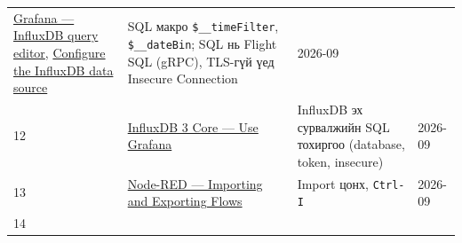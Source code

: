 \begin{longtable}[]{@{}llll@{}}
\begin{minipage}[t]{0.22\columnwidth}
\href{https://grafana.com/docs/grafana/latest/datasources/influxdb/query-editor/}{Grafana --- InfluxDB query editor}, \href{https://grafana.com/docs/grafana/latest/datasources/influxdb/configure/}{Configure the InfluxDB data source}\strut
\end{minipage} & \begin{minipage}[t]{0.22\columnwidth}\raggedright
SQL макро \texttt{\$\_\allowbreak{}\_\allowbreak{}timeFilter}, \texttt{\$\_\allowbreak{}\_\allowbreak{}dateBin}; SQL нь Flight SQL (gRPC), TLS-гүй үед Insecure Connection\strut
\end{minipage} & \begin{minipage}[t]{0.22\columnwidth}\raggedright
2026-09\strut
\end{minipage}\tabularnewline
\begin{minipage}[t]{0.22\columnwidth}\raggedright
12\strut
\end{minipage} & \begin{minipage}[t]{0.22\columnwidth}\raggedright
\href{https://docs.influxdata.com/influxdb3/core/visualize-data/grafana/}{InfluxDB 3 Core --- Use Grafana}\strut
\end{minipage} & \begin{minipage}[t]{0.22\columnwidth}\raggedright
InfluxDB эх сурвалжийн SQL тохиргоо (database, token, insecure)\strut
\end{minipage} & \begin{minipage}[t]{0.22\columnwidth}\raggedright
2026-09\strut
\end{minipage}\tabularnewline
\begin{minipage}[t]{0.22\columnwidth}\raggedright
13\strut
\end{minipage} & \begin{minipage}[t]{0.22\columnwidth}\raggedright
\href{https://nodered.org/docs/user-guide/editor/workspace/import-export}{Node-RED --- Importing and Exporting Flows}\strut
\end{minipage} & \begin{minipage}[t]{0.22\columnwidth}\raggedright
Import цонх, \texttt{Ctrl-I}\strut
\end{minipage} & \begin{minipage}[t]{0.22\columnwidth}\raggedright
2026-09\strut
\end{minipage}\tabularnewline
\begin{minipage}[t]{0.22\columnwidth}\raggedright
14\strut
\end{minipage} & \begin{minipage}[t]{0.22\columnwidth}\raggedright

\end{minipage}
\end{longtable}
